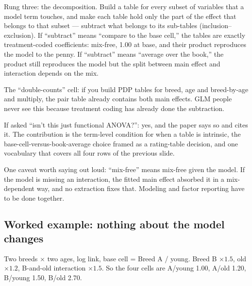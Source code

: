 \documentclass[
  letterpaper,
  DIV=11,
  numbers=noendperiod]{scrartcl}
\begin{document}
Rung three: the decomposition. Build a table for every subset of
variables that a model term touches, and make each table hold only the
part of the effect that belongs to that subset --- subtract what belongs
to its sub-tables (inclusion--exclusion). If ``subtract'' means
``compare to the base cell,'' the tables are exactly treatment-coded
coefficients: mix-free, 1.00 at base, and their product reproduces the
model to the penny. If ``subtract'' means ``average over the book,'' the
product still reproduces the model but the split between main effect and
interaction depends on the mix.

The ``double-counts'' cell: if you build PDP tables for breed, age and
breed-by-age and multiply, the pair table already contains both main
effects. GLM people never see this because treatment coding has already
done the subtraction.

If asked ``isn't this just functional ANOVA?'': yes, and the paper says
so and cites it. The contribution is the term-level condition for when a
table is intrinsic, the base-cell-versus-book-average choice framed as a
rating-table decision, and one vocabulary that covers all four rows of
the previous slide.

One caveat worth saying out loud: ``mix-free'' means mix-free given the
model. If the model is missing an interaction, the fitted main effect
absorbed it in a mix-dependent way, and no extraction fixes that.
Modeling and factor reporting have to be done together.

\subsection{Worked example: nothing about the model
changes}\label{example}

Two breeds \(\times\) two ages, log link, base cell = Breed A / young.
Breed B \(\times 1.5\), old \(\times 1.2\), B-and-old interaction
\(\times 1.5\). So the four cells are A/young 1.00, A/old 1.20, B/young
1.50, B/old 2.70.
\end{document}
